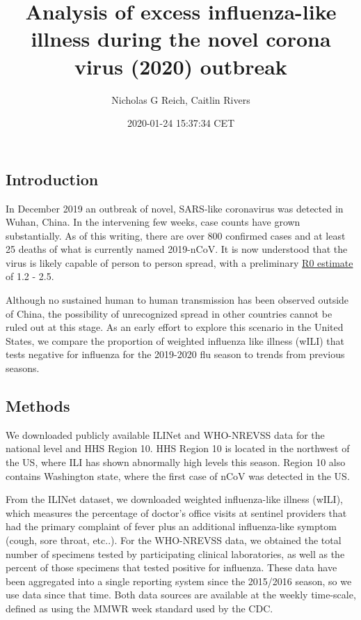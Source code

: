 \documentclass[]{article}
\title{Analysis of excess influenza-like illness during the novel corona virus
(2020) outbreak}
\author{Nicholas G Reich, Caitlin Rivers}
\date{2020-01-24 15:37:34 CET}
\begin{document}
\maketitle

\hypertarget{introduction}{%
\subsection{Introduction}\label{introduction}}

In December 2019 an outbreak of novel, SARS-like coronavirus was
detected in Wuhan, China. In the intervening few weeks, case counts have
grown substantially. As of this writing, there are over 800 confirmed
cases and at least 25 deaths of what is currently named 2019-nCoV. It is
now understood that the virus is likely capable of person to person
spread, with a preliminary
\href{https://www.who.int/news-room/detail/23-01-2020-statement-on-t}{R0
estimate} of 1.2 - 2.5.

Although no sustained human to human transmission has been observed
outside of China, the possibility of unrecognized spread in other
countries cannot be ruled out at this stage. As an early effort to
explore this scenario in the United States, we compare the proportion of
weighted influenza like illness (wILI) that tests negative for influenza
for the 2019-2020 flu season to trends from previous seasons.

\hypertarget{methods}{%
\subsection{Methods}\label{methods}}

We downloaded publicly available ILINet and WHO-NREVSS data for the
national level and HHS Region 10. HHS Region 10 is located in the
northwest of the US, where ILI has shown abnormally high levels this
season. Region 10 also contains Washington state, where the first case
of nCoV was detected in the US.

From the ILINet dataset, we downloaded weighted influenza-like illness
(wILI), which measures the percentage of doctor's office visits at
sentinel providers that had the primary complaint of fever plus an
additional influenza-like symptom (cough, sore throat, etc..). For the
WHO-NREVSS data, we obtained the total number of specimens tested by
participating clinical laboratories, as well as the percent of those
specimens that tested positive for influenza. These data have been
aggregated into a single reporting system since the 2015/2016 season, so
we use data since that time. Both data sources are available at the
weekly time-scale, defined as using the MMWR week standard used by the
CDC.
\end{document}
